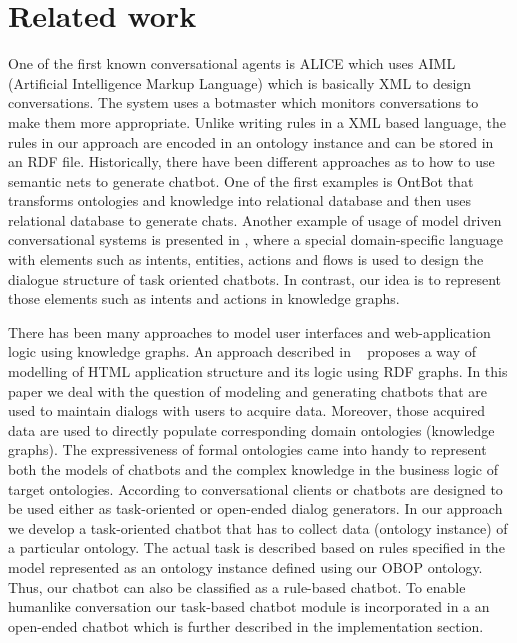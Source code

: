 \documentclass[runningheads]{llncs}
\begin{document}
\section{Related work}
One of the first known conversational agents is ALICE \cite{wallace2009anatomy} which uses AIML (Artificial Intelligence Markup Language) which is basically XML to design conversations. The system uses a botmaster which monitors conversations to make them more appropriate. Unlike writing rules in a XML based language, the rules in our approach are encoded in an ontology instance and can be stored in an RDF file. Historically, there have been different approaches as to how to use semantic nets to generate chatbot. One of the first examples is OntBot \cite{al2011ontbot} that transforms ontologies and knowledge into relational database and then uses relational database to generate chats. Another example of usage of model driven conversational systems is presented in \cite{perez2020model}, where a special domain-specific language with elements such as intents, entities, actions and flows is used to design the dialogue structure of task oriented chatbots. In contrast, our idea is to represent those elements such as intents and actions in knowledge graphs. \cite{bocklisch2017rasa}

There has been many approaches to model user interfaces and web-application logic using knowledge graphs. An approach described in ~\cite{rutesic2021enhanced} proposes a way of modelling of HTML application structure and its logic using RDF graphs.
In this paper we deal with the question of modeling and generating chatbots that are used to maintain dialogs with users to acquire data. Moreover, those acquired data are used to directly populate corresponding domain ontologies (knowledge graphs). The expressiveness of formal ontologies came into handy to represent both the models of chatbots and the complex knowledge in the business logic of target ontologies. According to \cite{agarwal2020review} conversational clients or chatbots are designed to be used either as task-oriented or open-ended dialog generators. In our approach we develop a task-oriented chatbot that has to collect data (ontology instance) of a particular ontology. The actual task is described based on rules specified in the model represented as an ontology instance defined using our OBOP ontology. Thus, our chatbot can also be classified as a rule-based chatbot. To enable humanlike conversation our task-based chatbot module is incorporated in a an open-ended chatbot which is further described in the implementation section.     
\end{document}
